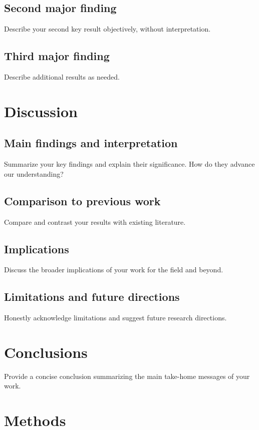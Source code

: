 \documentclass[12pt]{article}
\begin{document}
\subsection*{Second major finding}
Describe your second key result objectively, without interpretation.

\subsection*{Third major finding}
Describe additional results as needed.

\section*{Discussion}

\subsection*{Main findings and interpretation}
Summarize your key findings and explain their significance. How do they advance our understanding?

\subsection*{Comparison to previous work}
Compare and contrast your results with existing literature\cite{example2023}.

\subsection*{Implications}
Discuss the broader implications of your work for the field and beyond.

\subsection*{Limitations and future directions}
Honestly acknowledge limitations and suggest future research directions.

\section*{Conclusions}
Provide a concise conclusion summarizing the main take-home messages of your work.

\section*{Methods}
\end{document}
